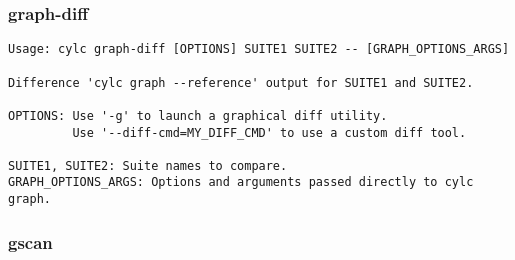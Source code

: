 \subsubsection{graph-diff}
\label{graph-diff}
\begin{lstlisting}
Usage: cylc graph-diff [OPTIONS] SUITE1 SUITE2 -- [GRAPH_OPTIONS_ARGS]

Difference 'cylc graph --reference' output for SUITE1 and SUITE2.

OPTIONS: Use '-g' to launch a graphical diff utility.
         Use '--diff-cmd=MY_DIFF_CMD' to use a custom diff tool.

SUITE1, SUITE2: Suite names to compare.
GRAPH_OPTIONS_ARGS: Options and arguments passed directly to cylc graph.
\end{lstlisting}
\subsubsection{gscan}
\label{gscan}
